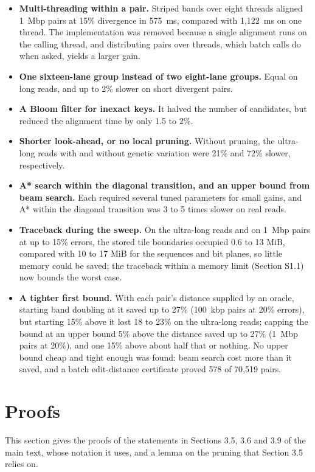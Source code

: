 \documentclass[10pt]{article}
\begin{document}
\begin{itemize}
  \item \textbf{Multi-threading within a pair.} Striped bands over eight threads aligned 1~Mbp pairs at 15\% divergence in 575~ms, compared with 1{,}122~ms on one thread. The implementation was removed because a single alignment runs on the calling thread, and distributing pairs over threads, which batch calls do when asked, yields a larger gain.
  \item \textbf{One sixteen-lane group instead of two eight-lane groups.} Equal on long reads, and up to 2\% slower on short divergent pairs.
  \item \textbf{A Bloom filter for inexact keys.} It halved the number of candidates, but reduced the alignment time by only 1.5 to 2\%.
  \item \textbf{Shorter look-ahead, or no local pruning.} Without pruning, the ultra-long reads with and without genetic variation were 21\% and 72\% slower, respectively.
  \item \textbf{A* search within the diagonal transition, and an upper bound from beam search.} Each required several tuned parameters for small gains, and A* within the diagonal transition was 3 to 5 times slower on real reads.
  \item \textbf{Traceback during the sweep.} On the ultra-long reads and on 1~Mbp pairs at up to 15\% errors, the stored tile boundaries occupied 0.6 to 13 MiB, compared with 10 to 17 MiB for the sequences and bit planes, so little memory could be saved; the traceback within a memory limit (Section S1.1) now bounds the worst case.
  \item \textbf{A tighter first bound.} With each pair's distance supplied by an oracle, starting band doubling at it saved up to 27\% (100~kbp pairs at 20\% errors), but starting 15\% above it lost 18 to 23\% on the ultra-long reads; capping the bound at an upper bound 5\% above the distance saved up to 27\% (1~Mbp pairs at 20\%), and one 15\% above about half that or nothing. No upper bound cheap and tight enough was found: beam search cost more than it saved, and a batch edit-distance certificate proved 578 of 70{,}519 pairs.
\end{itemize}

\section{Proofs}

This section gives the proofs of the statements in Sections 3.5, 3.6 and 3.9 of the main text, whose notation it uses, and a lemma on the pruning that Section 3.5 relies on.
\end{document}
